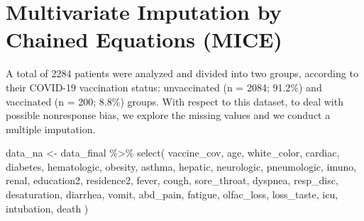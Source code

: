 \documentclass[
]{article}
\newenvironment{Shaded}{\begin{snugshade}}{\end{snugshade}}
\newcommand{\FunctionTok}[1]{\textcolor[rgb]{0.00,0.00,0.00}{#1}}
\newcommand{\NormalTok}[1]{#1}
\newcommand{\OtherTok}[1]{\textcolor[rgb]{0.56,0.35,0.01}{#1}}
\newcommand{\SpecialCharTok}[1]{\textcolor[rgb]{0.00,0.00,0.00}{#1}}
\begin{document}
\hypertarget{multivariate-imputation-by-chained-equations-mice}{%
\section{Multivariate Imputation by Chained Equations
(MICE)}\label{multivariate-imputation-by-chained-equations-mice}}

A total of 2284 patients were analyzed and divided into two groups,
according to their COVID-19 vaccination status: unvaccinated (n = 2084;
91.2\%) and vaccinated (n = 200; 8.8\%) groups. With respect to this
dataset, to deal with possible nonresponse bias, we explore the missing
values and we conduct a multiple imputation.

\begin{Shaded}
\begin{Highlighting}[]
\NormalTok{data\_na }\OtherTok{\textless{}{-}}\NormalTok{ data\_final }\SpecialCharTok{\%\textgreater{}\%}
  \FunctionTok{select}\NormalTok{(}
\NormalTok{    vaccine\_cov,}
\NormalTok{    age,}
\NormalTok{    white\_color,}
\NormalTok{    cardiac,}
\NormalTok{    diabetes,}
\NormalTok{    hematologic,}
\NormalTok{    obesity,}
\NormalTok{    asthma,}
\NormalTok{    hepatic,}
\NormalTok{    neurologic,}
\NormalTok{    pneumologic,}
\NormalTok{    imuno,}
\NormalTok{    renal,}
\NormalTok{    education2,}
\NormalTok{    residence2,}
\NormalTok{    fever,}
\NormalTok{    cough,}
\NormalTok{    sore\_throat,}
\NormalTok{    dyspnea,}
\NormalTok{    resp\_disc,}
\NormalTok{    desaturation,}
\NormalTok{    diarrhea,}
\NormalTok{    vomit,}
\NormalTok{    abd\_pain,}
\NormalTok{    fatigue,}
\NormalTok{    olfac\_loss,}
\NormalTok{    loss\_taste,}
\NormalTok{    icu,}
\NormalTok{    intubation,}
\NormalTok{    death}
\NormalTok{  )}


\end{Highlighting}
\end{Shaded}
\end{document}
